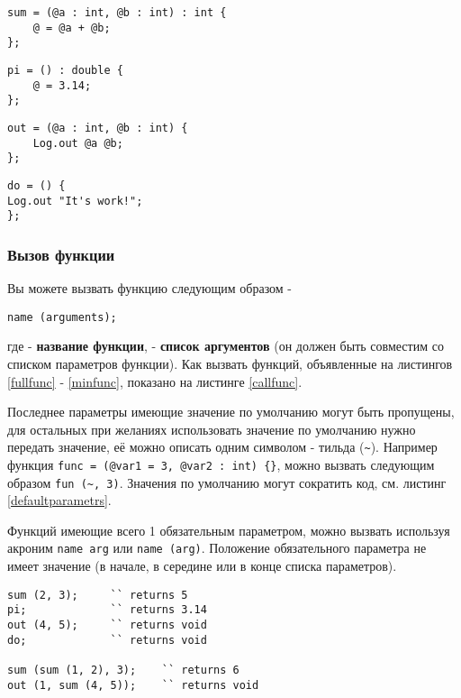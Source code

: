 \begin{lstlisting}[caption=Полноценная функция, label=fullfunc]
sum = (@a : int, @b : int) : int {
	@ = @a + @b;
};
\end{lstlisting}

\begin{lstlisting}[caption=Функция без аргументов, label=noargsfunc]
pi = () : double {
	@ = 3.14;
};
\end{lstlisting}

\begin{lstlisting}[caption=Функция без типа возвращаемой значений, label=notypefunc]
out = (@a : int, @b : int) {
	Log.out @a @b;
};
\end{lstlisting}

\begin{lstlisting}[caption=Функция без аргументов и тип возвращаемой значений, label=minfunc]
do = () {
Log.out "It's work!";
};
\end{lstlisting}

\subsubsection{Вызов функции}

Вы можете вызвать функцию следующим образом -
\begin{lstlisting}[numbers=none]
name (arguments);
\end{lstlisting}
где  - {\bf название функции},  - {\bf список аргументов} (он должен быть совместим со списком параметров функции). Как вызвать функций, объявленные на листингов \ref{fullfunc} - \ref{minfunc}, показано на листинге \ref{callfunc}. 

Последнее параметры имеющие значение по умолчанию могут быть пропущены, для остальных при желаниях использовать значение по умолчанию нужно передать \void{} значение, её можно описать одним символом - тильда (\lstinline|~|). Например функция \lstinline|func = (@var1 = 3, @var2 : int) {}|, можно вызвать следующим образом \lstinline|fun (~, 3)|. Значения по умолчанию могут сократить код, см. листинг \ref{defaultparametrs}.

Функций имеющие всего 1 обязательным параметром, можно вызвать используя акроним \lstinline|name arg| или \lstinline|name (arg)|. Положение обязательного параметра не имеет значение (в начале, в середине или в конце списка параметров).

\begin{lstlisting}[caption=Вызов функций, label=callfunc]
sum (2, 3); 	`` returns 5
pi;				`` returns 3.14
out (4, 5); 	`` returns void
do;				`` returns void

sum (sum (1, 2), 3);	`` returns 6
out (1, sum (4, 5));	`` returns void
\end{lstlisting}

